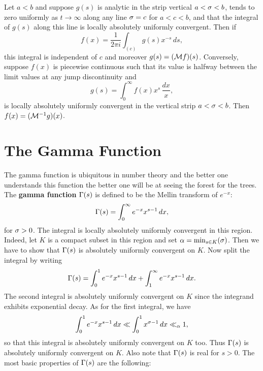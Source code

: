       \begin{theorem*}
        Let $a < b$ and suppose $g(s)$ is analytic in the strip vertical $a < \sigma < b$, tends to zero uniformly as $t \to \infty$ along any line $\sigma = c$ for $a < c < b$, and that the integral of $g(s)$ along this line is locally absolutely uniformly convergent. Then if
        \[
          f(x) = \frac{1}{2\pi i}\int_{(c)}g(s)x^{-s}\,ds,
        \]
        this integral is independent of $c$ and moreover $g(s) = (\mathcal{M}f)(s)$. Conversely, suppose $f(x)$ is piecewise continuous such that its value is halfway between the limit values at any jump discontinuity and
        \[
          g(s) = \int_{0}^{\infty}f(x)x^{s}\,\frac{dx}{x},
        \]
        is locally absolutely uniformly convergent in the vertical strip $a < \sigma < b$. Then $f(x) = (\mathcal{M}^{-1}g)(x)$.
      \end{theorem*}
  \section{The Gamma Function}
    The gamma function is ubiquitous in number theory and the better one understands this function the better one will be at seeing the forest for the trees. The \textbf{gamma function} $\Gamma(s)$ is defined to be the Mellin transform of $e^{-x}$:
    \[
      \Gamma(s) = \int_{0}^{\infty}e^{-x}x^{s-1}\,dx,
    \]
    for $\sigma > 0$. The integral is locally absolutely uniformly convergent in this region. Indeed, let $K$ is a compact subset in this region and set $\alpha = \min_{s \in K}(\sigma)$. Then we have to show that $\Gamma(s)$ is absolutely uniformly convergent on $K$. Now split the integral by writing
    \[
      \Gamma(s) = \int_{0}^{1}e^{-x}x^{s-1}\,dx+\int_{1}^{\infty}e^{-x}x^{s-1}\,dx.
    \]
    The second integral is absolutely uniformly convergent on $K$ since the integrand exhibits exponential decay. As for the first integral, we have
    \[
      \int_{0}^{1}e^{-x}x^{s-1}\,dx \ll \int_{0}^{1}x^{\sigma-1}\,dx \ll_{\alpha} 1,
    \]
    so that this integral is absolutely uniformly convergent on $K$ too. Thus $\Gamma(s)$ is absolutely uniformly convergent on $K$. Also note that $\Gamma(s)$ is real for $s > 0$. The most basic properties of $\Gamma(s)$ are the following:

